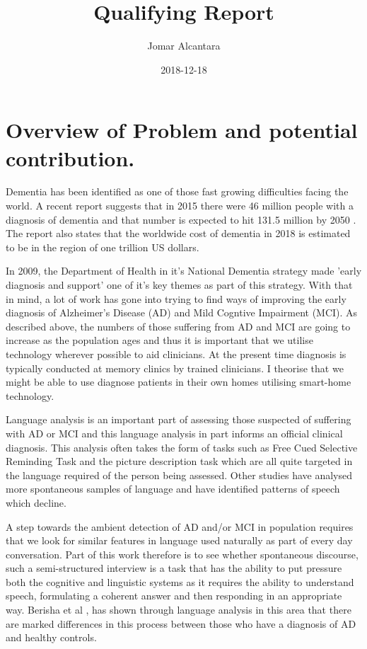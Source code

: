 \documentclass{article}
\title{Qualifying Report}
\date{2018-12-18}
\author{Jomar Alcantara}
\begin{document}
\maketitle
\newpage
\tableofcontents
\newpage
\section{Overview of Problem and potential contribution.}
Dementia has been identified as one of those fast growing difficulties facing the world. A recent report suggests that in 2015 there were 46 million people with a diagnosis of dementia and that number is expected to hit 131.5 million by 2050 \cite{Prince2015}. The report also states that the worldwide cost of dementia in 2018 is estimated to be in the region of one trillion US dollars.
\newline
\par
In 2009, the Department of Health in it's National Dementia strategy made 'early diagnosis and support' one of it's key themes as part of this strategy. With that in mind, a lot of work has gone into trying to find ways of improving the early diagnosis of Alzheimer's Disease (AD) and Mild Cogntive Impairment (MCI). As described above, the numbers of those suffering from AD and MCI are going to increase as the population ages and thus it is important that we utilise technology wherever possible to aid clinicians. At the present time diagnosis is typically conducted at memory clinics by trained clinicians. I theorise that we might be able to use diagnose patients in their own homes utilising smart-home technology.
\newline
\par
Language analysis is an important part of assessing those suspected of suffering with AD or MCI and this language analysis in part informs an official clinical diagnosis. This analysis often takes the form of tasks such as Free Cued Selective Reminding Task and the picture description task which are all quite targeted in the language required of the person being assessed. Other studies have analysed more spontaneous samples of language and have identified patterns of speech which decline. 
\newline
\par
A step towards the ambient detection of AD and/or MCI in population requires that we look for similar features in language used naturally as part of every day conversation. Part of this work therefore is to see whether spontaneous discourse, such a semi-structured interview is a task that has the ability to put pressure both the cognitive and linguistic systems as it requires the ability to understand speech, formulating a coherent answer and then responding in an appropriate way. Berisha et al \cite{Berisha2015}, has shown through language analysis in this area that there are marked differences in this process between those who have a diagnosis of AD and healthy controls.
\end{document}
